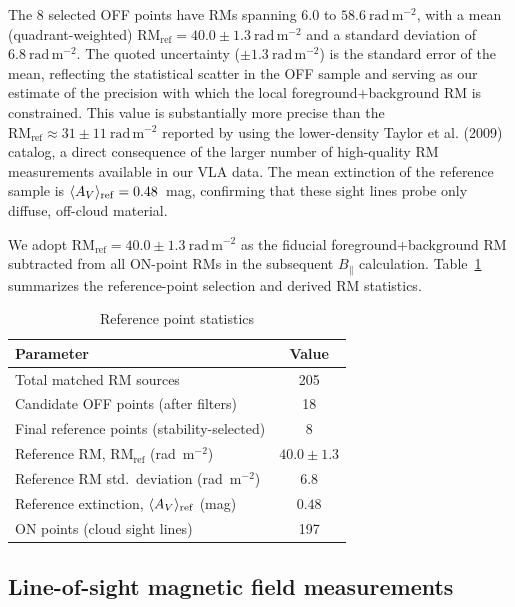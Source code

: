 \documentclass[twocolumn]{aastex631}
\begin{document}
The 8 selected OFF points have RMs spanning $6.0$ to $58.6~\mathrm{rad\,m^{-2}}$, with a mean (quadrant-weighted) $\mathrm{RM_{ref}} = 40.0 \pm 1.3~\mathrm{rad\,m^{-2}}$ and a standard deviation of $6.8~\mathrm{rad\,m^{-2}}$. The quoted uncertainty ($\pm 1.3~\mathrm{rad\,m^{-2}}$) is the standard error of the mean, reflecting the statistical scatter in the OFF sample and serving as our estimate of the precision with which the local foreground+background RM is constrained. This value is substantially more precise than the $\mathrm{RM_{ref}} \approx 31 \pm 11~\mathrm{rad\,m^{-2}}$ reported by \citet{tahani2018} using the lower-density Taylor et al. (2009) catalog, a direct consequence of the larger number of high-quality RM measurements available in our VLA data. The mean extinction of the reference sample is $\langle A_V \rangle_{\rm ref} = 0.48$~mag, confirming that these sight lines probe only diffuse, off-cloud material.

We adopt $\mathrm{RM_{ref}} = 40.0 \pm 1.3~\mathrm{rad\,m^{-2}}$ as the fiducial foreground+background RM subtracted from all ON-point RMs in the subsequent $B_\parallel$ calculation. Table~\ref{tab:reference-statistics} summarizes the reference-point selection and derived RM statistics.

\begin{table}
\centering
\caption{Reference point statistics}
\label{tab:reference-statistics}
\begin{tabular}{lc}
\toprule
Parameter & Value \\
\midrule
Total matched RM sources & 205 \\
Candidate OFF points (after filters) & 18 \\
Final reference points (stability-selected) & 8 \\
\midrule
Reference RM, $\mathrm{RM_{ref}}$ (rad~m$^{-2}$) & $40.0 \pm 1.3$ \\
Reference RM std.\ deviation (rad~m$^{-2}$) & $6.8$ \\
Reference extinction, $\langle A_V \rangle_{\rm ref}$ (mag) & $0.48$ \\
\midrule
ON points (cloud sight lines) & 197 \\
\bottomrule
\end{tabular}
\end{table}

\subsection{Line-of-sight magnetic field measurements}
\end{document}
